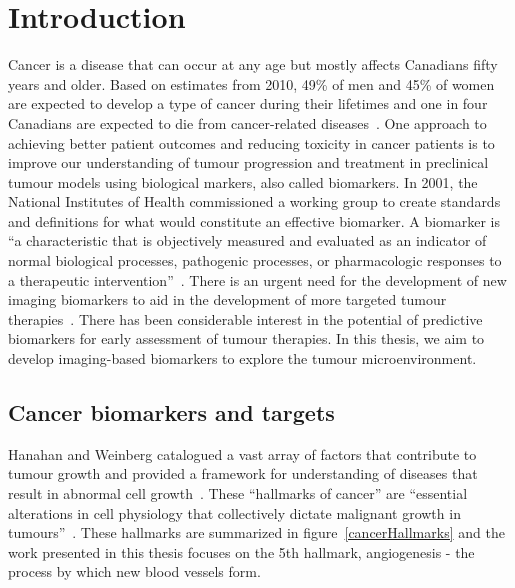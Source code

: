 
\chapter{Introduction}
\label{ch:Introduction}

Cancer is a disease that can occur at any age but mostly affects Canadians fifty years and older.
Based on estimates from 2010, 49\% of men and 45\% of women are expected to develop a type of cancer during their lifetimes and one in four Canadians are expected to die from cancer-related diseases~\cite{CancerSociety:2018tv}.
One approach to achieving better patient outcomes and reducing toxicity in cancer patients is to improve our understanding of tumour progression and treatment in preclinical tumour models using biological markers, also called biomarkers.
In 2001, the National Institutes of Health commissioned a working group to create standards and definitions for what would constitute an effective biomarker. 
A biomarker is ``a characteristic that is objectively measured and evaluated as an indicator of normal biological processes, pathogenic processes, or pharmacologic responses to a therapeutic intervention''~\cite{BiomarkersDefinitionsWorkingGroup:2001gd}.  
There is an urgent need for the development of new imaging biomarkers to aid in the development of more targeted tumour therapies~\cite{vanderMeel:2010cb}.
There has been considerable interest in the potential of predictive biomarkers for early assessment of tumour therapies. 
In this thesis, we aim to develop imaging-based biomarkers to explore the tumour microenvironment.

\section{Cancer biomarkers and targets} 

Hanahan and Weinberg catalogued a vast array of factors that contribute to tumour growth and provided a framework for understanding of diseases that result in abnormal cell growth~\cite{Hanahan:2000wo,Hanahan:2011gu}.
These ``hallmarks of cancer'' are ``essential alterations in cell physiology that collectively dictate malignant growth in tumours''~\cite{Hanahan:2000wo}.
These hallmarks are summarized in figure~\ref{cancerHallmarks} and the  work presented in this thesis focuses on the 5th hallmark, angiogenesis - the process by which new blood vessels form.

